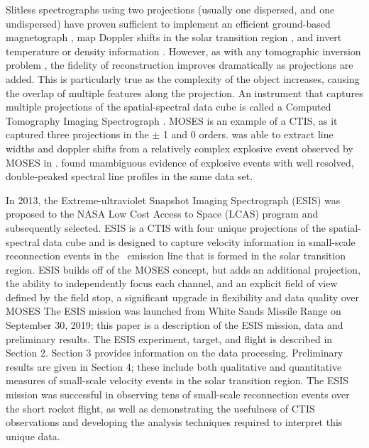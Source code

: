     Slitless spectrographs using two projections (usually one dispersed, and one undispersed) have proven sufficient to implement an efficient ground-based magnetograph \citep{DeforestStereoscopy2004}, map Doppler shifts in the solar transition region \citep{Courrier2018}, and invert temperature or density information \citep{winebarger2019}. 
    However, as with any tomographic inversion problem \citep[e.g.,][]{KakSlaney2001}, the fidelity of reconstruction improves dramatically as projections are added. 
    This is particularly true as the complexity of the object increases, causing the overlap of multiple features along the projection. 
    An instrument that captures multiple projections of the spatial-spectral data cube is called a Computed Tomography Imaging Spectrograph  \cite[CTIS,][]{DescourDereniakCTIS1995}.  
    MOSES is an example of a CTIS, as it captured three projections in the $\pm$ 1 and 0 orders.  
    \cite{Fox10} was able to extract line widths and doppler shifts from a relatively complex explosive event observed by MOSES in \heii.  
    \cite{Rust2019} found unambiguous evidence of explosive events with well resolved, double-peaked spectral line profiles in the same data set.
    
    In 2013, the Extreme-ultraviolet Snapshot Imaging Spectrograph (ESIS) was proposed to the NASA Low Cost Access to Space (LCAS) program and subsequently selected.  
    ESIS is a CTIS with four unique projections of the spatial-spectral data cube and is designed to capture velocity information in small-scale reconnection events in the \ov \ emission line that is formed in the solar transition region. 
    ESIS builds off of the MOSES concept, but adds an additional projection, the ability to independently focus each channel, and an explicit field of view defined by the field stop, a significant upgrade in flexibility and data quality over MOSES
    The ESIS mission was launched from White Sands Missile Range on September 30,  2019; this paper is a description of the ESIS mission, data and preliminary results.  
    The ESIS experiment, target, and flight is described in Section 2.  
    Section 3 provides information on the data processing.  Preliminary results are given in Section 4; these include both qualitative and quantitative measures of small-scale velocity events in the solar transition region.  The ESIS mission was successful in  observing tens of small-scale reconnection events over the short rocket flight, as well as demonstrating the usefulness of CTIS observations and developing the analysis techniques required to interpret this unique data.


